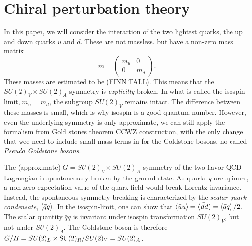 \section{Chiral perturbation theory}

In this paper, we will consider the interaction of the two lightest quarks, the up and down quarks $u$ and $d$.
These are not massless, but have a non-zero mass matrix
\begin{equation}
    \label{Mass matrix}
    m =
    \begin{pmatrix}
        m_u & 0 \\
        0 & m_d
    \end{pmatrix}.
\end{equation}
These masses are estimated to be (FINN TALL).
This means that the $SU(2)_V \times SU(2)_A$ symmetry is \emph{explicitly} broken.
In what is called the isospin limit, $m_u = m_d$, the subgroup $SU(2)_V$ remains intact.
The difference between these masses is small, which is why isospin is a good quantum number.
However, even the underlying symmetry is only approximate, we can still apply the formalism from Gold stones theorem CCWZ construction, with the only change that wee need to include small mass terms in for the Goldstone bosons, no called \emph{Pseudo Goldstone bosons}.

The (approximate) $G = SU(2)_V\times SU(2)_A$ symmetry of the two-flavor QCD-Lagrangian is spontaneously broken by the ground state.
As quarks $q$ are spinors, a non-zero expectation value of the quark field would break Lorentz-invariance.
Instead, the spontaneous symmetry breaking is characterized by the \emph{scalar quark condensate}, $\ex{\bar q q}$.
In the isospin-limit, one can show that $\ex{\bar u u } = \ex{\bar d d} = \ex{\bar q q} / 2$.
The scalar quantity $\bar q q$ is invariant under isospin transformation $SU(2)_V$, but not under $SU(2)_A$.
The Goldstone boson is therefore $G/H = SU(2)_L\times\mathrm{SU}(2)_R/SU(2)_V = SU(2)_A$.


